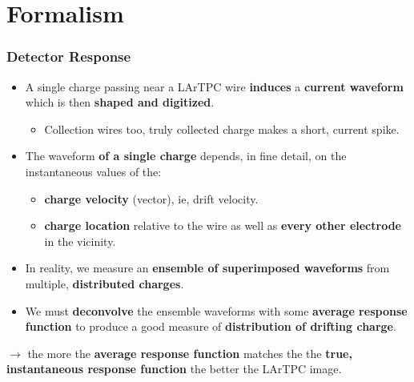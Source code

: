 \documentclass[xcolor=dvipsnames]{beamer}
\begin{document}



\section{Formalism}

\begin{frame}
  \frametitle{Detector Response}
  \begin{itemize}
  \item A single charge passing near a LArTPC wire \textbf{induces} a
    \textbf{current waveform} which is then \textbf{shaped and digitized}.
    \begin{itemize}\scriptsize
    \item Collection wires too, truly collected charge makes a short,
      current spike.
    \end{itemize}
  \item The waveform \textbf{of a single charge} depends, in fine
    detail, on the instantaneous values of the:
    \begin{itemize}\footnotesize
    \item \textbf{charge velocity} (vector), ie, drift velocity.
    \item \textbf{charge location} relative to the wire as well
      as \textbf{every other electrode} in the vicinity.
    \end{itemize}
  \item In reality, we measure an \textbf{ensemble of superimposed
      waveforms} from multiple, \textbf{distributed charges}.
  \item We must \textbf{deconvolve} the ensemble waveforms
    with some \textbf{average response function} to produce a good
    measure of \textbf{distribution of drifting charge}.
  \end{itemize}
  
  \footnotesize
  $\rightarrow$ the more the \textbf{average response function}
  matches the the \textbf{true, instantaneous response function} the better
  the LArTPC image.

\end{frame}
\end{document}
